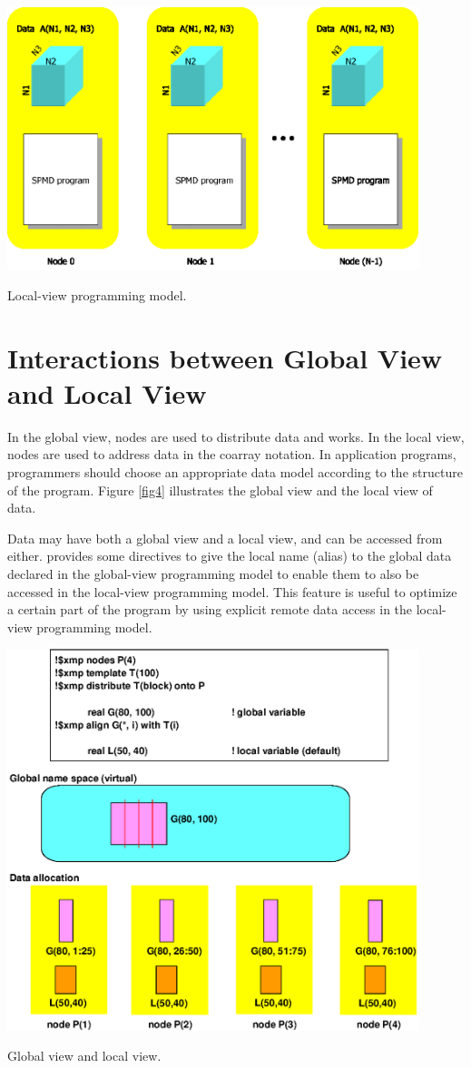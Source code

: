 \begin{myfigure}
\includegraphics[width=12cm]{figs/Fig3.eps}
  \caption{Local-view programming model.}
\label{fig3}
\end{myfigure}

\section{Interactions between Global View and Local View}

In the global view, nodes are used to distribute data and works. In the
local view, nodes are used to address data in the coarray notation.
%
In application programs,
programmers should choose an appropriate data model according to the
structure of the program. Figure \ref{fig4} illustrates the global view
and the local view of data.

Data may have both a global view and a local view, and can be accessed
from either. {\XMP} provides some directives to give the local name
(alias) to the global data declared in the global-view programming model
to enable them to also be accessed in the local-view programming
model. This feature is useful to optimize a certain part of the program
by using explicit remote data access in the local-view programming
model.

\begin{myfigure}
\includegraphics[width=12cm]{figs/Fig4.eps}
  \caption{Global view and local view.}
\label{fig4}
\end{myfigure}

